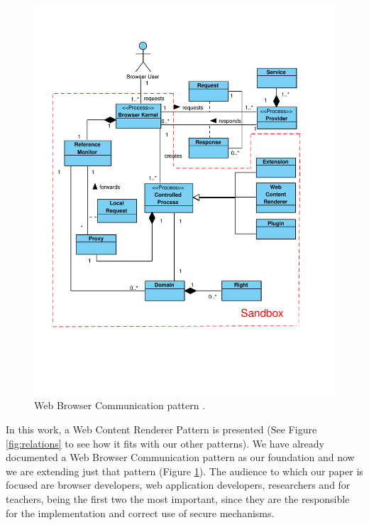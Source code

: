 \documentclass[prodmode,acmtecs]{acmsmall}
\begin{document}
    \begin{figure}[h!t]
      \vspace*{-1.5cm}
      \centering
      \includegraphics[scale=0.55]{figures/BrowserInfrastructure-v3.pdf}
      \vspace*{-2.3cm}
      \caption{Web Browser Communication pattern \cite{silva2015}.}
      \label{fig:WBCP}
    \end{figure}

In this work, a Web Content Renderer Pattern is presented (See Figure \ref{fig:relations} to see how it fits with our other patterns). We have already documented a Web Browser Communication pattern as our foundation and now we are extending just that pattern \cite{silva2015} (Figure \ref{fig:WBCP}). The audience to which our paper is focused are browser developers, web application developers, researchers and for teachers, being the first two the most important, since they are the responsible for the implementation and correct use of secure mechanisms. 
\end{document}

